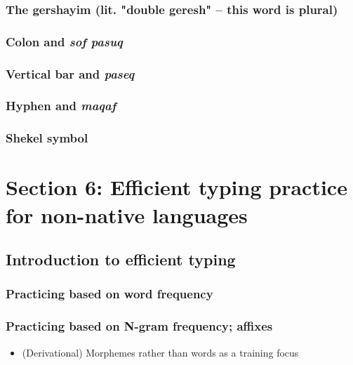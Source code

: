\documentclass[11pt]{article}
\begin{document}
\subsubsection{The gershayim (lit. "double geresh" -- this word is plural)}
\label{sec:org3fd608e}

\subsubsection{Colon and \emph{sof pasuq}}
\label{sec:org6b9cce5}

\subsubsection{Vertical bar and \emph{paseq}}
\label{sec:orgf832505}

\subsubsection{Hyphen and \emph{maqaf}}
\label{sec:org04bd78b}

\subsubsection{Shekel symbol}
\label{sec:orgf3bf69a}

\section{Section 6: Efficient typing practice for non-native languages}
\label{sec:orgdd633a7}

\subsection{Introduction to efficient typing}
\label{sec:org92686a3}

\subsubsection{Practicing based on word frequency}
\label{sec:org3a3395b}

\subsubsection{Practicing based on N-gram frequency; affixes}
\label{sec:org538da46}

\begin{itemize}
\item (Derivational) Morphemes rather than words as a training focus
\end{itemize}
\end{document}
